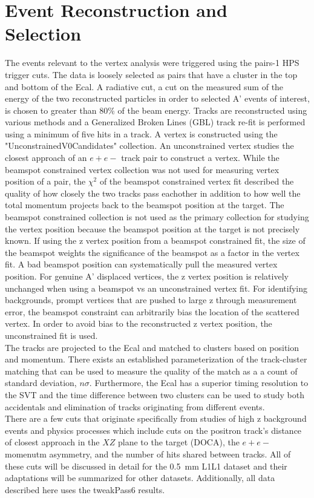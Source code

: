 \documentclass[twoside]{article}
\begin{document}
\section{Event Reconstruction and Selection}

The events relevant to the vertex analysis were triggered using the pairs-1 HPS trigger cuts. The data is loosely selected as pairs that have a cluster in the top and bottom of the Ecal. A radiative cut, a cut on the measured sum of the energy of the two reconstructed particles in order to selected A' events of interest, is chosen to greater than 80$\%$ of the beam energy. Tracks are reconstructed using various methods and a Generalized Broken Lines (GBL) track re-fit is performed using a minimum of five hits in a track. A vertex is constructed using the "UnconstrainedV0Candidates" collection. An unconstrained vertex studies the closest approach of an $e+e-$ track pair to construct a vertex. While the beamspot constrained vertex collection was not used for measuring vertex position of a pair, the $\chi^{2}$ of the beamspot constrained vertex fit described the quality of how closely the two tracks pass eachother in addition to how well the total momentum projects back to the beamspot position at the target. 
\indent The beamspot constrained collection is not used as the primary collection for studying the vertex position because the beamspot position at the target is not precisely known. If using the z vertex position from a beamspot constrained fit, the size of the beamspot weights the significance of the beamspot as a factor in the vertex fit. A bad beamspot position can systematically pull the measured vertex position. For genuine A' displaced vertices, the z vertex position  is relatively unchanged when using a beamspot vs an unconstrained vertex fit. For identifying backgrounds, prompt vertices that are pushed to large z through measurement error, the beamspot constraint can arbitrarily bias the location of the scattered vertex. In order to avoid bias to the reconstructed z vertex position, the unconstrained fit is used.  \\
\indent The tracks are projected to the Ecal and matched to clusters based on position and momentum. There exists an established parameterization of the track-cluster matching that can be used to measure the quality of the match as a a count of standard deviation, $n\sigma$. Furthermore, the Ecal has a superior timing resolution to the SVT and the time difference between two clusters can be used to study both accidentals and elimination of tracks originating from different events. \\
\indent There are a few cuts that originate specifically from studies of high z background events and physics processes which include cuts on the positron track's distance of closest approach in the $XZ$ plane to the target (DOCA), the $e+e-$ momenutm asymmetry, and the number of hits shared between tracks. All of these cuts will be discussed in detail for the 0.5~mm L1L1 dataset and their adaptations will be summarized for other datasets. Additionally, all data described here uses the tweakPass6 results. 
\end{document}
